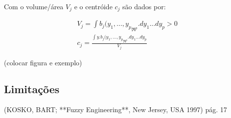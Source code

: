 Com o volume/área $V_j$ e o centróide $c_j$ são dados por:

\begin{eqnarray}
V_j = \int{b_j(y_1,...,y_p}_{\Re^{p}}.dy_1...dy_p > 0\\
c_j = \frac{\int{y.b_j(y_1,...,y_p}_{\Re^{p}}.dy_1...dy_p}{V_j}
\end{eqnarray}

(colocar figura e exemplo)

\subsection{Limitações}

(KOSKO, BART; **Fuzzy Engineering**, New Jersey, USA 1997) pág. 17
